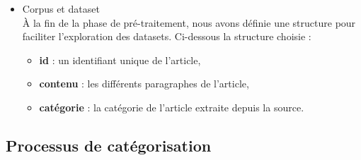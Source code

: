         \begin{itemize}[leftmargin=*, label={}]
            \item{Corpus et dataset}\\
                À la fin de la phase de pré-traitement, nous avons définie une structure pour faciliter l'exploration des datasets. Ci-dessous la structure choisie :
                \begin{itemize}
                   \item{\textbf{id} : }un identifiant unique de l'article,
                   \item{\textbf{contenu} : }les différents paragraphes de l'article,
                   \item{\textbf{catégorie} : }la catégorie de l'article extraite depuis la source.
                \end{itemize}
        \end{itemize}

    \subsection{Processus de catégorisation}
